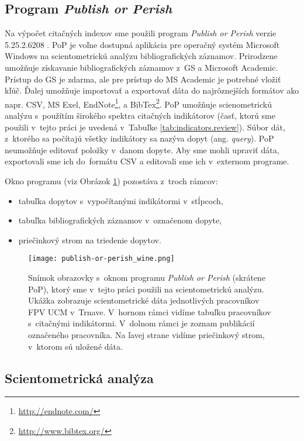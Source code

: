 \subsection{Program \emph{Publish or Perish}}
\label{sec:pop}

Na výpočet citačných indexov sme použili program \emph{Publish or Perish} verzie
5.25.2.6208 \citep{Harzing2011}.  PoP je voľne dostupná aplikácia pre operačný
systém Microsoft Windows na scientometrickú analýzu bibliografických záznamov.
Prirodzene umožňuje získavanie bibliografických záznamov z~GS a Microsoft
Academic. Prístup do GS je zdarma, ale pre prístup do MS Academic je potrebné vložiť kľúč.
Ďalej umožňuje importovať a exportovať dáta do najrôznejších formátov ako napr.
CSV, MS Exel, EndNote\footnote{\url{http://endnote.com/}}, a
BibTex\footnote{\url{http://www.bibtex.org/}}.  PoP umožňuje scienometrickú
analýzu s~použítím širokého spektra citačných indikátorov (časť, ktorú sme použili
v~tejto práci je uvedená v~Tabuľke \ref{tab:indicators.review}).
Súbor dát, z~ktorého sa počítajú všetky indikátory sa nazýva dopyt (ang. \emph{query}).
PoP neumožňuje editovať položky v~danom dopyte. Aby sme mohli upraviť dáta,  exportovali
sme ich do~formátu CSV a editovali sme ich v~externom programe.

Okno programu (viz Obrázok
\ref{fig:pop.screenshot}) pozostáva z~troch rámcov:
\begin{itemize}
  \item tabuľka dopytov s~vypočítanými indikátormi v~stĺpcoch,
  \item tabuľka bibliografických záznamov v~označenom dopyte,
  \item priečinkový strom na triedenie dopytov.
\end{itemize}

\begin{figure}
  \centering
  \texttt{[image: publish-or-perish\_wine.png]}
  \caption[Snímok obrazovky s~oknom programu \emph{Publish or Perish}.]
  {Snímok obrazovky s~oknom programu \emph{Publish or Perish} (skrátene PoP),
  ktorý sme v~tejto práci použili na scientometrickú analýzu.  Ukážka zobrazuje
  scientometrické dáta jednotlivých pracovníkov FPV UCM v~Trnave. V~hornom
  rámci vidíme tabuľku pracovníkov s~citačnými indikátormi. V~dolnom rámci je
  zoznam publikácií označeného pracovníka. Na ľavej strane vidíme priečinkový
  strom, v~ktorom sú uložené dáta.}
  \label{fig:pop.screenshot}
\end{figure}


\subsection{Scientometrická analýza}

